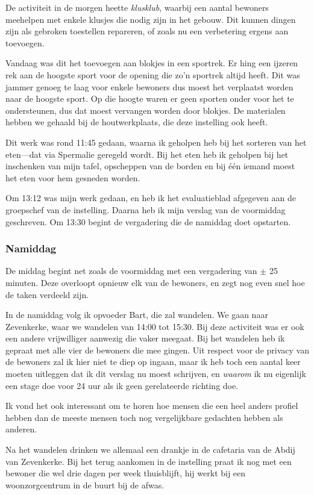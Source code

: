 \documentclass[a4paper,12pt]{article}
\begin{document}
De activiteit in de morgen heette \emph{klusklub}, waarbij een aantal bewoners meehelpen met enkele klusjes die nodig zijn in het gebouw. Dit kunnen dingen zijn als gebroken toestellen repareren, of zoals nu een verbetering ergens aan toevoegen.

Vandaag was dit het toevoegen aan blokjes in een sportrek. Er hing een ijzeren rek aan de hoogste sport voor de opening die zo'n sportrek altijd heeft. Dit was jammer genoeg te laag voor enkele bewoners dus moest het verplaatst worden naar de hoogste sport. Op die hoogte waren er geen sporten onder voor het te ondersteunen, dus dat moest vervangen worden door blokjes. De materialen hebben we gehaald bij de houtwerkplaats, die deze instelling ook heeft.

Dit werk was rond 11:45 gedaan, waarna ik geholpen heb bij het sorteren van het eten---dat via Spermalie geregeld wordt. Bij het eten heb ik geholpen bij het inschenken van mijn tafel, opscheppen van de borden en bij één iemand moest het eten voor hem gesneden worden.

Om 13:12 was mijn werk gedaan, en heb ik het evaluatieblad afgegeven aan de groepschef van de instelling. Daarna heb ik mijn verslag van de voormiddag geschreven. Om 13:30 begint de vergadering die de namiddag doet opstarten.

\subsubsection{Namiddag}

De middag begint net zoals de voormiddag met een vergadering van $\pm$ 25 minuten. Deze overloopt opnieuw elk van de bewoners, en zegt nog even snel hoe de taken verdeeld zijn.

In de namiddag volg ik opvoeder Bart, die zal wandelen. We gaan naar Zevenkerke, waar we wandelen van 14:00 tot 15:30. Bij deze activiteit was er ook een andere vrijwilliger aanwezig die vaker meegaat. Bij het wandelen heb ik gepraat met alle vier de bewoners die mee gingen. Uit respect voor de privacy van de bewoners zal ik hier niet te diep op ingaan, maar ik heb toch een aantal keer moeten uitleggen dat ik dit verslag nu moest schrijven, en \emph{waarom} ik nu eigenlijk een stage doe voor 24 uur als ik geen gerelateerde richting doe.

Ik vond het ook interessant om te horen hoe mensen die een heel anders profiel hebben dan de meeste mensen toch nog vergelijkbare gedachten hebben als anderen.

Na het wandelen drinken we allemaal een drankje in de cafetaria van de Abdij van Zevenkerke. Bij het terug aankomen in de instelling praat ik nog met een bewoner die wel drie dagen per week thuisblijft, hij werkt bij een woonzorgcentrum in de buurt bij de afwas.
\end{document}
